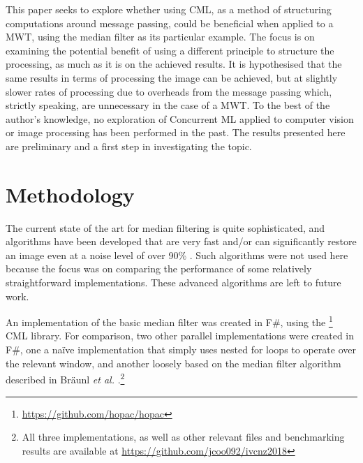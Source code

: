 This paper seeks to explore whether using CML, as a method of structuring computations around message passing, could be beneficial when applied to a MWT, using the median filter as its particular example.  The focus is on examining the potential benefit of using a different principle to structure the processing, as much as it is on the achieved results.  It is hypothesised that the same results in terms of processing the image can be achieved, but at slightly slower rates of processing due to overheads from the message passing which, strictly speaking, are unnecessary in the case of a MWT. To the best of the author's knowledge, no exploration of Concurrent ML applied to computer vision or image processing has been performed in the past.  The results presented here are preliminary and a first step in investigating the topic.


\section{Methodology}

The current state of the art for median filtering is quite sophisticated, and algorithms have been developed that are very fast \cite{Sanchez2012,Perrot2014} and/or can significantly restore an image even at a noise level of over 90\% \cite{Gao2015,Wu2011}.  Such algorithms were not used here because the focus was on comparing the performance of some relatively straightforward implementations.  These advanced algorithms are left to future work.

An implementation of the basic median filter was created in F\#, using the \hopac{}\footnote{\url{https://github.com/hopac/hopac}} CML library.  For comparison, two other parallel implementations were created in F\#, one a na\"{i}ve implementation that simply uses nested for loops to operate over the relevant window, and another loosely based on the median filter algorithm described in Br\"{a}unl \textit{et al.} \cite{Braunl2001}.\footnote{All three implementations, as well as other relevant files and benchmarking results are available at \url{https://github.com/jcoo092/ivcnz2018}}

